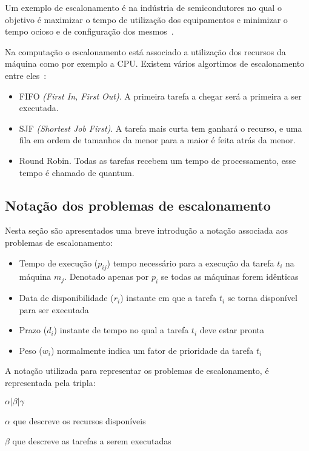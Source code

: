 Um exemplo de escalonamento é na indústria de semicondutores  no qual o objetivo é maximizar o tempo de utilização dos equipamentos e minimizar o tempo ocioso e de configuração dos mesmos~\citep{pinedo2012scheduling}.

Na computação o escalonamento está associado a utilização dos recursos da máquina como por exemplo a CPU. Existem vários algortimos de escalonamento entre eles~\citep{tanenbaum2006sistemas}:
\begin{itemize}
	\item FIFO \textit{(First In, First Out)}. A primeira tarefa a chegar será a primeira a ser executada.
	\item SJF \textit{(Shortest Job First)}. A tarefa mais curta tem ganhará o recurso, e uma fila em ordem de tamanhos da menor para a maior é feita atrás da menor.
	\item Round Robin. Todas as tarefas recebem um tempo de processamento, esse tempo é chamado de quantum.

\end{itemize}


\subsection{Notação dos problemas de escalonamento}

Nesta seção são apresentados uma breve introdução a notação associada aos problemas de escalonamento:

\begin{itemize}
\item Tempo de execução ($p_{ij}$) tempo necessário para a execução da tarefa $t_i$ na máquina $m_j$. Denotado apenas por $p_i$ se todas as máquinas forem idênticas
\item Data de disponibilidade ($r_i$) instante em que a tarefa $t_i$ se torna disponível para ser executada
\item Prazo ($d_i$) instante de tempo no qual a tarefa $t_i$ deve estar pronta
\item Peso ($w_i$) normalmente indica um fator de prioridade da tarefa $t_i$
\end{itemize}

A notação utilizada para representar os problemas de escalonamento, é representada pela tripla:   

$\alpha | \beta | \gamma$

$\alpha$ 	que descreve os recursos disponíveis

$\beta$ que descreve as tarefas a serem executadas

